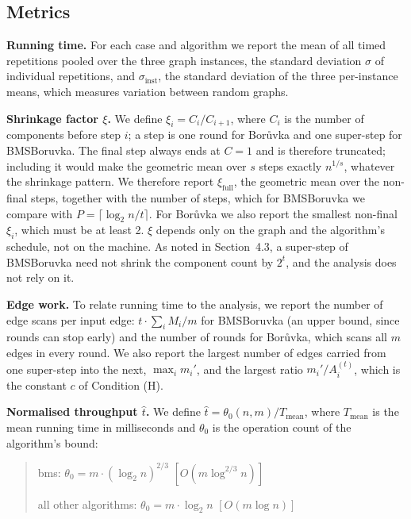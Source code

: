 \documentclass[11pt]{article}
\theoremstyle{plain}
\theoremstyle{remark}
\begin{document}
\subsection{Metrics}

\textbf{Running time.} For each case and algorithm we report the mean
of all timed repetitions pooled over the three graph instances, the
standard deviation \(\sigma\) of individual repetitions, and
\(\sigma_{\text{inst}}\), the standard deviation of the three
per-instance means, which measures variation between random graphs.

\textbf{Shrinkage factor \(\xi\).} We define
\(\xi_i = C_i / C_{i+1}\), where \(C_i\) is the number of components
before step \(i\); a step is one round for Borůvka and one super-step
for BMSBoruvka. The final step always ends at \(C = 1\) and is
therefore truncated; including it would make the geometric mean over
\(s\) steps exactly \(n^{1/s}\), whatever the shrinkage pattern. We
therefore report \(\xi_{\text{full}}\), the geometric mean over the
non-final steps, together with the number of steps, which for
BMSBoruvka we compare with \(P = \lceil \log_2 n / t \rceil\). For
Borůvka we also report the smallest non-final \(\xi_i\), which must be
at least 2. \(\xi\) depends only on the graph and the algorithm's
schedule, not on the machine. As noted in Section~4.3, a super-step of
BMSBoruvka need not shrink the component count by \(2^{t}\), and the
analysis does not rely on it.

\textbf{Edge work.} To relate running time to the analysis, we report
the number of edge scans per input edge: \(t \cdot \sum_i M_i / m\)
for BMSBoruvka (an upper bound, since rounds can stop early) and the
number of rounds for Borůvka, which scans all \(m\) edges in every
round. We also report the largest number of edges carried from one
super-step into the next, \(\max_i m_i'\), and the largest ratio
\(m_i' / A_i^{(t)}\), which is the constant \(c\) of Condition (H).

\textbf{Normalised throughput \(\widehat{t}\).} We define
\(\widehat{t} = \theta_0(n, m) / T_{\text{mean}}\), where
\(T_{\text{mean}}\) is the mean running time in milliseconds and
\(\theta_0\) is the operation count of the algorithm's bound:

\begin{quote}
bms: \(\theta_0 = m \cdot (\log_2 n)^{2/3}\)
\quad \([O(m \log^{2/3} n)]\)

all other algorithms: \(\theta_0 = m \cdot \log_2 n\)
\quad \([O(m \log n)]\)
\end{quote}
\end{document}
